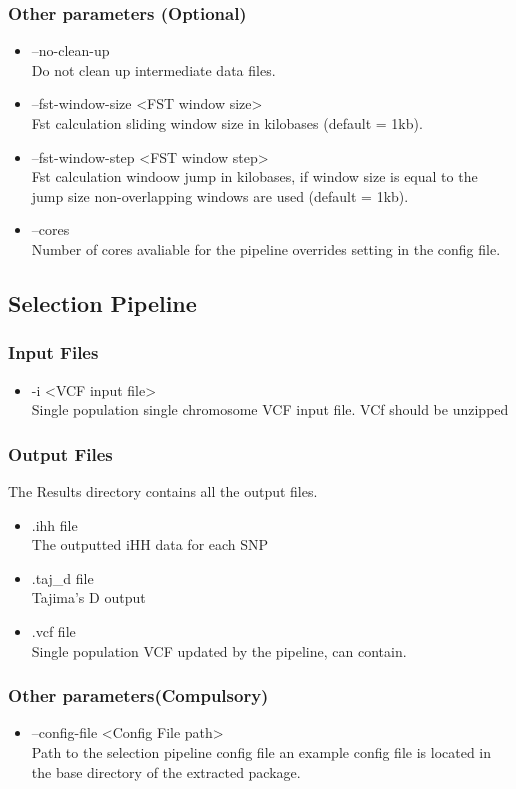 \documentclass[a4paper,10pt]{article}
\begin{document}
\subsubsection{Other parameters (Optional)}
\begin{itemize}
\item --no-clean-up\\ 
Do not clean up intermediate data files.
\item --fst-window-size <FST window size>\\
Fst calculation sliding window size in kilobases (default = 1kb).
\item --fst-window-step <FST window step>\\
Fst calculation windoow jump in kilobases, if window size is equal to
the jump size non-overlapping windows are used (default = 1kb).
\item --cores \\
Number of cores avaliable for the pipeline overrides setting in the config file.
\end{itemize}
\subsection{Selection Pipeline}
\subsubsection{Input Files}
\begin{itemize}
\item -i <VCF input file>\\
Single population single chromosome VCF input file. VCf should be unzipped
\end{itemize}
\subsubsection{Output Files}
The Results directory contains all the output files.
\begin{itemize}
\item .ihh file\\
The outputted iHH data for each SNP
\item .taj\_d file\\
Tajima's D output
\item .vcf file\\
Single population VCF updated by the pipeline, can contain.
\end{itemize}
\subsubsection{Other parameters(Compulsory)}
\begin{itemize}
\item --config-file <Config File path>\\
Path to the selection pipeline config file an example config file is
located in the base directory of the extracted package.
\end{itemize}
\end{document}
